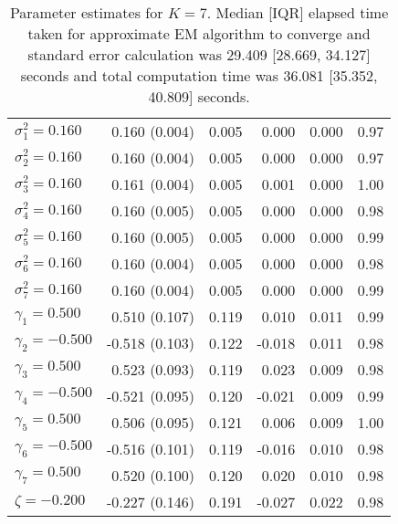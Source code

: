 \begin{table}[ht]
\begin{tabular}{l|rrrrr}
  $\sigma^2_1 = 0.160$ &  0.160 (0.004) & 0.005 &  0.000 & 0.000 & 0.97 \\ 
  $\sigma^2_2 = 0.160$ &  0.160 (0.004) & 0.005 &  0.000 & 0.000 & 0.97 \\ 
  $\sigma^2_3 = 0.160$ &  0.161 (0.004) & 0.005 &  0.001 & 0.000 & 1.00 \\ 
  $\sigma^2_4 = 0.160$ &  0.160 (0.005) & 0.005 &  0.000 & 0.000 & 0.98 \\ 
  $\sigma^2_5 = 0.160$ &  0.160 (0.005) & 0.005 &  0.000 & 0.000 & 0.99 \\ 
  $\sigma^2_6 = 0.160$ &  0.160 (0.004) & 0.005 &  0.000 & 0.000 & 0.98 \\ 
  $\sigma^2_7 = 0.160$ &  0.160 (0.004) & 0.005 &  0.000 & 0.000 & 0.99 \\ 
  $\gamma_1 = 0.500$ &  0.510 (0.107) & 0.119 &  0.010 & 0.011 & 0.99 \\ 
  $\gamma_2 = -0.500$ & -0.518 (0.103) & 0.122 & -0.018 & 0.011 & 0.98 \\ 
  $\gamma_3 = 0.500$ &  0.523 (0.093) & 0.119 &  0.023 & 0.009 & 0.98 \\ 
  $\gamma_4 = -0.500$ & -0.521 (0.095) & 0.120 & -0.021 & 0.009 & 0.99 \\ 
  $\gamma_5 = 0.500$ &  0.506 (0.095) & 0.121 &  0.006 & 0.009 & 1.00 \\ 
  $\gamma_6 = -0.500$ & -0.516 (0.101) & 0.119 & -0.016 & 0.010 & 0.98 \\ 
  $\gamma_7 = 0.500$ &  0.520 (0.100) & 0.120 &  0.020 & 0.010 & 0.98 \\ 
  $\zeta = -0.200$ & -0.227 (0.146) & 0.191 & -0.027 & 0.022 & 0.98 \\ 
   \hline
\end{tabular}
\endgroup
\caption{Parameter estimates for $K=7$. Median [IQR] elapsed time taken for approximate EM algorithm to converge and standard error calculation was 29.409 [28.669, 34.127] seconds and total computation time was 36.081 [35.352, 40.809] seconds.} 
\end{table}
\clearpage
{}
\thispagestyle{empty}
